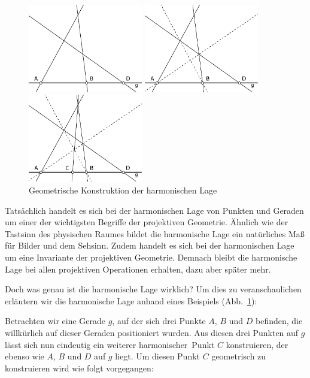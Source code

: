 \documentclass[12pt,a4paper]{article}
\begin{document}
\begin{figure}
\centering
\includegraphics[width=5cm]{Bilder/herleitung1.png}

\vspace{0.5cm}
\centering
\includegraphics[width=5cm]{Bilder/herleitung2.png}

\vspace{0.5cm}
\centering
\includegraphics[width=5cm]{Bilder/herleitung3.png}
\caption{Geometrische Konstruktion der harmonischen Lage}
\label{fig:Herleitung}
\end{figure}

Tatsächlich handelt es sich bei der harmonischen Lage von Punkten und Geraden um einer der wichtigsten Begriffe der projektiven Geometrie. Ähnlich wie der Tastsinn des physischen Raumes bildet die harmonische Lage ein natürliches Maß für Bilder und dem Sehsinn. Zudem handelt es sich bei der harmonischen Lage um eine Invariante der projektiven Geometrie. Demnach bleibt die harmonische Lage bei allen projektiven Operationen erhalten, dazu aber später mehr.

Doch was genau ist die harmonische Lage wirklich? Um dies zu veranschaulichen erläutern wir die harmonische Lage anhand eines Beispiels (Abb.~\ref{fig:Herleitung}):

Betrachten wir eine Gerade $g$, auf der sich drei Punkte $A$, $B$ und $D$ befinden, die willkürlich auf dieser Geraden positioniert wurden. Aus diesen drei Punkten auf $g$ lässt sich nun eindeutig ein weiterer \glqq harmonischer\grqq ~Punkt $C$ konstruieren, der ebenso wie $A$, $B$ und $D$ auf $g$ liegt. Um diesen Punkt $C$ geometrisch zu konstruieren wird wie folgt vorgegangen:
\end{document}
